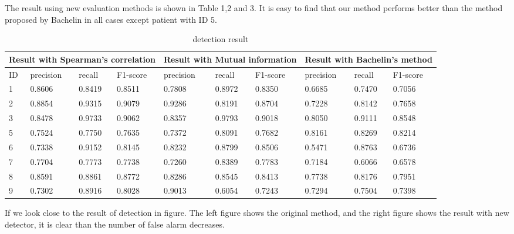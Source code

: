\documentclass[article]{article}
\begin{document}
The result using new evaluation methods is shown in Table 1,2 and 3. It is easy to find that our method performs better than the method proposed by Bachelin in all cases except patient with ID 5. 



 \begin{table}
    \begin{center}
   		\begin{tabular}{  |p{0.5cm}||p{1.3cm}|p{1.3cm}|p{1.3cm}|p{1.3cm}|p{1.3cm}|p{1.3cm}|p{1.3cm}|p{1.3cm}|p{1.3cm}| }
		\hline
		\multicolumn{4}{|c|}{Result with Spearman's correlation} &\multicolumn{3}{|c|}{Result with Mutual information}&\multicolumn{3}{|c|}{Result with Bachelin's method}  \\
	
		\hline
		 ID &  precision &  recall &  F1-score &  precision &  recall &  F1-score &  precision &  recall &  F1-score\\
		\hline
		1 & 0.8606 &0.8419 & 0.8511 & 0.7808 &0.8972 & 0.8350 & 0.6685 &0.7470 & 0.7056 \\
		2 & 0.8854 &0.9315 & 0.9079 & 0.9286 &0.8191 & 0.8704  & 0.7228 &0.8142 & 0.7658\\ 
		
		3 & 0.8478 &0.9733 & 0.9062 & 0.8357 &0.9793 & 0.9018 & 0.8050 &0.9111 & 0.8548 \\   
		
		5 & 0.7524 &0.7750 & 0.7635  & 0.7372 &0.8091 & 0.7682  & 0.8161 &0.8269 & 0.8214 \\
		
		6 & 0.7338 &0.9152 & 0.8145 & 0.8232 &0.8799 & 0.8506 & 0.5471 &0.8763 & 0.6736 \\
		
		7 & 0.7704 &0.7773 & 0.7738 & 0.7260 &0.8389 & 0.7783&  0.7184 &0.6066 & 0.6578\\
		
		8 & 0.8591 &0.8861 & 0.8772 & 0.8286 &0.8545 & 0.8413 & 0.7738 &0.8176 & 0.7951   \\	
		
		9 & 0.7302 &0.8916 & 0.8028 & 0.9013 &0.6054 & 0.7243 & 0.7294 &0.7504 & 0.7398\\
		\hline
		\end{tabular}
	\caption{detection result}
\end{center}
     \end{table}
   If we look close to the result of detection in figure. The left figure shows the original method, and the right figure shows the result with new detector, it is clear than the number of false alarm decreases.
   
\end{document}
